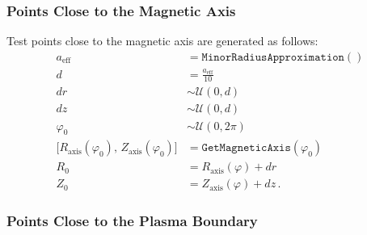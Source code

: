 \subsubsection{Points Close to the Magnetic Axis}
%
Test points close to the magnetic axis are generated as follows:
\begin{align}
  a_\textrm{eff} &= \texttt{MinorRadiusApproximation}() \\
  d &= \frac{a_\textrm{eff}}{10} \\
  dr &\sim \mathcal{U}(0,d) \\
  dz &\sim \mathcal{U}(0,d) \\
  \varphi_0 &\sim \mathcal{U}(0,2\pi) \\
  \bigl[R_{\mathrm{axis}}(\varphi_0),\,Z_{\mathrm{axis}}(\varphi_0)\bigr] &= \texttt{GetMagneticAxis}(\varphi_0) \\
  R_{0} &= R_{\mathrm{axis}}(\varphi) + dr \\
  Z_{0} &= Z_{\mathrm{axis}}(\varphi) + dz \, .
\end{align}


\subsubsection{Points Close to the Plasma Boundary}

